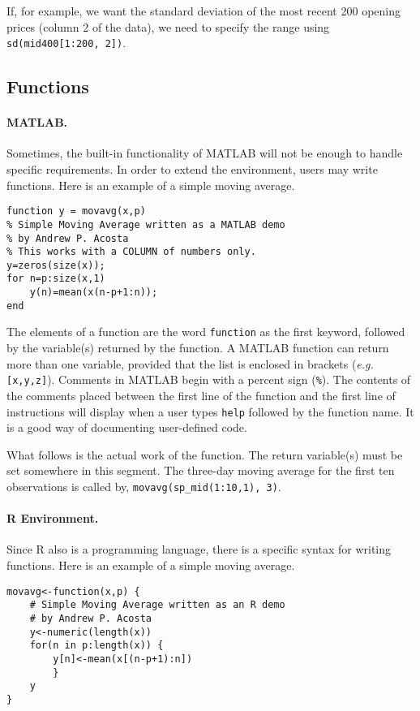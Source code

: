 If, for example, we want the standard deviation of the most recent 200 opening prices (column 2 of the data), we need to specify the range using \texttt{sd(mid400[1:200, 2])}.

\subsection{Functions}
\paragraph{MATLAB.} Sometimes, the built-in functionality of MATLAB will not be enough to handle specific requirements. In order to extend the environment, users may write functions. Here is an example of a simple moving average.
\begin{verbatim}
function y = movavg(x,p)
% Simple Moving Average written as a MATLAB demo
% by Andrew P. Acosta
% This works with a COLUMN of numbers only.
y=zeros(size(x));
for n=p:size(x,1)
    y(n)=mean(x(n-p+1:n));
end
\end{verbatim}

The elements of a function are the word \texttt{function} as the first keyword, followed by the variable(s) returned by the function. A MATLAB function can return more than one variable, provided that the list is enclosed in brackets (\textit{e.g.} \texttt{[x,y,z]}). Comments in MATLAB begin with a percent sign (\texttt{\%}). The contents of the comments placed between the first line of the function and the first line of instructions will display when a user types \texttt{help} followed by the function name. It is a good way of documenting user-defined code.

What follows is the actual work of the function. The return variable(s) must be set somewhere in this segment. The three-day moving average for the first ten observations is called by, \texttt{movavg(sp\_mid(1:10,1), 3)}.


\paragraph{R Environment.} Since R also is a programming language, there is a specific syntax for writing functions. Here is an example of a simple moving average.
\pagebreak[3] %
\begin{verbatim}
movavg<-function(x,p) { 
    # Simple Moving Average written as an R demo 
    # by Andrew P. Acosta
    y<-numeric(length(x))
    for(n in p:length(x)) {
        y[n]<-mean(x[(n-p+1):n])
        }
    y
}
\end{verbatim}
\pagebreak[3]
	
